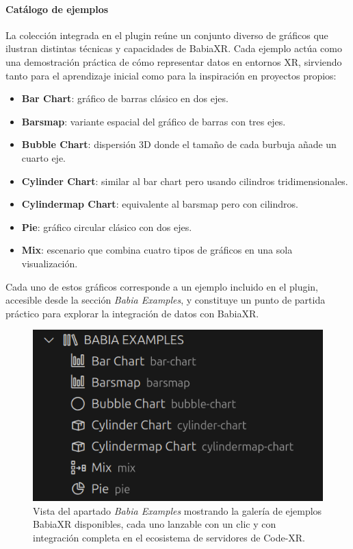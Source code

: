 \documentclass[a4paper, 12pt]{book}
\begin{document}
\paragraph{Catálogo de ejemplos}
La colección integrada en el plugin reúne un conjunto diverso de gráficos que ilustran distintas técnicas y capacidades de BabiaXR. Cada ejemplo actúa como una demostración práctica de cómo representar datos en entornos XR, sirviendo tanto para el aprendizaje inicial como para la inspiración en proyectos propios:

\begin{itemize}
  \item \textbf{Bar Chart}: gráfico de barras clásico en dos ejes.
  \item \textbf{Barsmap}: variante espacial del gráfico de barras con tres ejes.
  \item \textbf{Bubble Chart}: dispersión 3D donde el tamaño de cada burbuja añade un cuarto eje.
  \item \textbf{Cylinder Chart}: similar al bar chart pero usando cilindros tridimensionales.
  \item \textbf{Cylindermap Chart}: equivalente al barsmap pero con cilindros.
  \item \textbf{Pie}: gráfico circular clásico con dos ejes.
  \item \textbf{Mix}: escenario que combina cuatro tipos de gráficos en una sola visualización.
\end{itemize}


Cada uno de estos gráficos corresponde a un ejemplo incluido en el plugin, accesible desde la sección \emph{Babia Examples}, y constituye un punto de partida práctico para explorar la integración de datos con BabiaXR.


\begin{figure}[H]
\centering
\includegraphics[width=0.55\linewidth]{img/ui-babia-examples.png}
\caption{Vista del apartado \emph{Babia Examples} mostrando la galería de ejemplos BabiaXR disponibles, cada uno lanzable con un clic y con integración completa en el ecosistema de servidores de Code-XR.}
\label{fig:ui-babia-examples}
\end{figure}
\end{document}
